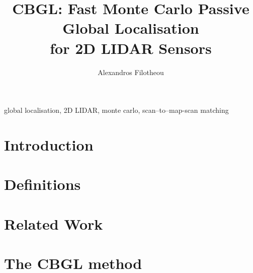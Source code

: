 \documentclass[letterpaper, 10 pt, conference]{ieeeconf}
\begin{document}
\title{\LARGE \bf CBGL: Fast Monte Carlo Passive Global Localisation \\ for 2D LIDAR Sensors}

\author{Alexandros Filotheou}

\maketitle
\thispagestyle{empty}
\pagestyle{empty}

\begin{abstract}
  
\end{abstract}

\begin{keywords}
global localisation, 2D LIDAR, monte carlo, scan--to--map-scan matching
\end{keywords}

\section{Introduction}
  

\section{Definitions}
  \label{section:definitions}
  

\section{Related Work}
  \label{section:sota}
  

\section{The CBGL method}
  \label{section:the_proposed_method}
  

\end{document}
